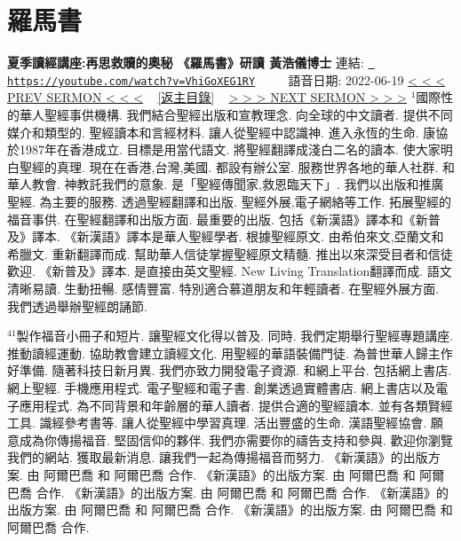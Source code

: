 \documentclass{book}
\begin{document}
\section{羅馬書}
\label{sec:VhiGoXEG1RY}
\textbf{夏季讀經講座:再思救贖的奧秘 《羅馬書》研讀 黃浩儀博士}
\newline
\newline
連結: \href{https://youtube.com/watch?v=VhiGoXEG1RY}{\texttt{ https://youtube.com/watch?v=VhiGoXEG1RY}} ~~~~ 語音日期: 2022-06-19 
\newline
\newline
\hyperref[sec:0UjUn93f77k]{\small{< < < PREV SERMON < < <}}
~
\hyperref[sec:index]{\small{[返主目錄]}}
~
\hyperref[sec:A_3yEYQkm9Y]{\small{> > > NEXT SERMON > > >}}
\newline
\newline
$^{1}$國際性的華人聖經事供機構.
我們結合聖經出版和宣教理念.
向全球的中文讀者.
提供不同媒介和類型的.
聖經讀本和言經材料.
讓人從聖經中認識神.
進入永恆的生命.
康協於1987年在香港成立.
目標是用當代語文.
將聖經翻譯成淺白二名的讀本.
使大家明白聖經的真理.
現在在香港,台灣,美國.
都設有辦公室.
服務世界各地的華人社群.
和華人教會.
神教託我們的意象.
是「聖經傳聞家,救恩臨天下」.
我們以出版和推廣聖經.
為主要的服務.
透過聖經翻譯和出版.
聖經外展,電子網絡等工作.
拓展聖經的福音事供.
在聖經翻譯和出版方面.
最重要的出版.
包括《新漢語》譯本和《新普及》譯本.
《新漢語》譯本是華人聖經學者.
根據聖經原文.
由希伯來文,亞蘭文和希臘文.
重新翻譯而成.
幫助華人信徒掌握聖經原文精髓.
推出以來深受目者和信徒歡迎.
《新普及》譯本.
是直接由英文聖經.
New Living Translation翻譯而成.
語文清晰易讀.
生動扭暢.
感情豐富.
特別適合慕道朋友和年輕讀者.
在聖經外展方面.
我們透過舉辦聖經朗誦節.

$^{41}$製作福音小冊子和短片.
讓聖經文化得以普及.
同時.
我們定期舉行聖經專題講座.
推動讀經運動.
協助教會建立讀經文化.
用聖經的華語裝備門徒.
為普世華人歸主作好準備.
隨著科技日新月異.
我們亦致力開發電子資源.
和網上平台.
包括網上書店.
網上聖經.
手機應用程式.
電子聖經和電子書.
創業透過實體書店.
網上書店以及電子應用程式.
為不同背景和年齡層的華人讀者.
提供合適的聖經讀本.
並有各類賢經工具.
識經參考書等.
讓人從聖經中學習真理.
活出豐盛的生命.
漢語聖經協會.
願意成為你傳揚福音.
堅固信仰的夥伴.
我們亦需要你的禱告支持和參與.
歡迎你瀏覽我們的網站.
獲取最新消息.
讓我們一起為傳揚福音而努力.
《新漢語》的出版方案.
由 阿爾巴喬 和 阿爾巴喬 合作.
《新漢語》的出版方案.
由 阿爾巴喬 和 阿爾巴喬 合作.
《新漢語》的出版方案.
由 阿爾巴喬 和 阿爾巴喬 合作.
《新漢語》的出版方案.
由 阿爾巴喬 和 阿爾巴喬 合作.
《新漢語》的出版方案.
由 阿爾巴喬 和 阿爾巴喬 合作.
\end{document}
